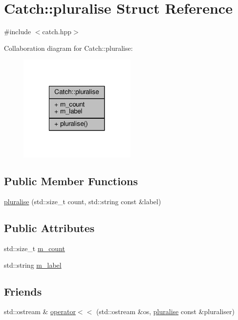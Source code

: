 \hypertarget{struct_catch_1_1pluralise}{\section{Catch\-:\-:pluralise Struct Reference}
\label{struct_catch_1_1pluralise}
}


{\ttfamily \#include $<$catch.\-hpp$>$}



Collaboration diagram for Catch\-:\-:pluralise\-:
\nopagebreak
\begin{figure}[H]
\begin{center}
\leavevmode
\includegraphics[width=164pt]{struct_catch_1_1pluralise__coll__graph}
\end{center}
\end{figure}
\subsection*{Public Member Functions}
\begin{DoxyCompactItemize}
\item 
\hyperlink{struct_catch_1_1pluralise_a5c55e22de2416cfe416edf715c6b9234}{pluralise} (std\-::size\-\_\-t count, std\-::string const \&label)
\end{DoxyCompactItemize}
\subsection*{Public Attributes}
\begin{DoxyCompactItemize}
\item 
std\-::size\-\_\-t \hyperlink{struct_catch_1_1pluralise_a4dce2fa13ec6f00fac09b2418265441e}{m\-\_\-count}
\item 
std\-::string \hyperlink{struct_catch_1_1pluralise_a8849cbdd3f11ebe7747597c8644e8793}{m\-\_\-label}
\end{DoxyCompactItemize}
\subsection*{Friends}
\begin{DoxyCompactItemize}
\item 
std\-::ostream \& \hyperlink{struct_catch_1_1pluralise_aa7dac6b165514c1f85e0695d678fdef5}{operator$<$$<$} (std\-::ostream \&os, \hyperlink{struct_catch_1_1pluralise}{pluralise} const \&pluraliser)
\end{DoxyCompactItemize}


